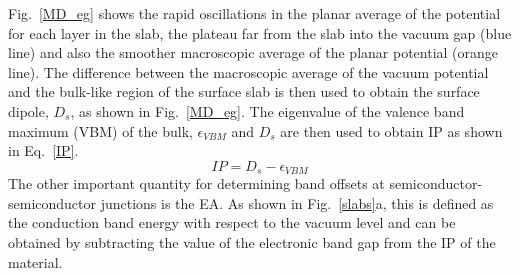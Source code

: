 \documentclass[11pt, twoside]{report}
\begin{document}
Fig.~\ref{MD_eg} shows the rapid oscillations in the planar average of the potential for each layer in the slab, the plateau far from the slab into the vacuum gap (blue line) and also the smoother macroscopic average of the planar potential (orange line).
The difference between the macroscopic average of the vacuum potential and the bulk-like region of the surface slab is then used to obtain the surface dipole, $D_s$, as shown in Fig.~\ref{MD_eg}.  The eigenvalue of the valence band maximum (VBM) of the bulk, $\epsilon_{VBM}$ and $D_s$ are then used to obtain IP as shown in Eq.~\ref{IP}.
\begin{equation}\label{IP}
IP = D_s - \epsilon_{VBM}
\end{equation}
The other important quantity for determining band offsets at semiconductor-semiconductor junctions is the EA. As shown in Fig.~\ref{slabs}a, this is defined as the conduction band energy with respect to the vacuum level and can be obtained by subtracting the value of the electronic band gap from the IP of the material. 
\end{document}
